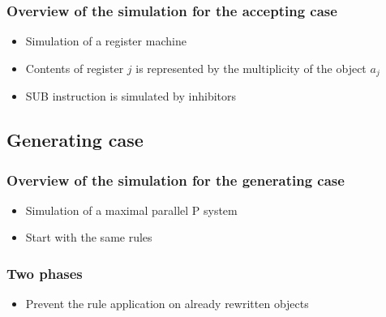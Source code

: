     \begin{frame}[t]\frametitle{Overview of the simulation for the accepting case}
      \begin{itemize}
        \item Simulation of a register machine
        \item Contents of register $j$ is represented by the multiplicity of the object $a_j$
        \item SUB instruction is simulated by inhibitors
      \end{itemize}
    \end{frame}
    \note{}


  \subsection{Generating case} %
  \label{sub:generating_case}

    \begin{frame}[t]\frametitle{Overview of the simulation for the generating case}
      \begin{itemize}
        \item Simulation of a maximal parallel P system
        \item Start with the same rules
      \end{itemize}
      \simulationpicture
    \end{frame}
    \note{}

    \begin{frame}[t]\frametitle{Two phases}
      \begin{itemize}
        \item Prevent the rule application on already rewritten objects
      \end{itemize}
    \end{frame}
    \note{}

